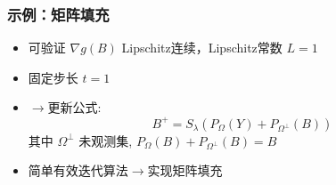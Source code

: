 \documentclass[handout]{beamer}
\begin{document}
\begin{frame}

\frametitle{示例：矩阵填充}

\begin{itemize}

 \item 可验证 $\nabla g(B)$ Lipschitz连续，Lipschitz常数 $L=1$
 
\item   固定步长 $t=1$


\item $\rightarrow$更新公式:
\begin{equation}
B^{+}=S_{\lambda}\left(P_{\Omega}(Y)+P_{\Omega^{\perp}} (B)\right)
\end{equation}
其中 $ {\Omega^{\perp}}$ 未观测集, $P_{\Omega}(B)+P_{\Omega^{\perp}}(B)=B$

\item 简单有效迭代算法$\rightarrow$实现矩阵填充 

\end{itemize} 
\end{frame}
\end{document}
